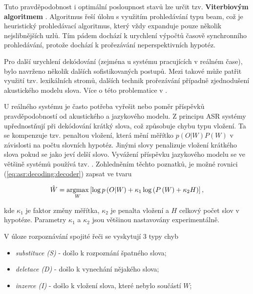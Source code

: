 \noindent Tuto pravděpodobnost i optimální posloupnost stavů lze určit tzv. \textbf{Viterbiovým algoritmem} \cite{Holmes2001}. Algoritmus řeší úlohu s využitím prohledávání typu beam, což je heuristický prohledávací algoritmus, který vždy expanduje pouze několik nejslibnějších uzlů. Tím pádem dochází k urychlení výpočtů časově synchronního prohledávání, protože dochází k prořezávání neperspektivních hypotéz.

Pro další urychlení dekódování (zejména u systému pracujících v reálném čase), bylo navrženo několik dalších sofistikovaných postupů. Mezi takové může patřit využití tzv. lexikálních stromů, dalších technik prořezávání případně zjednodušení akustického modelu slova. Více o této problematice v \cite{Psutka2006}.

U reálného systému je často potřeba vyřešit nebo  poměr příspěvků pravděpodobností od akustického a jazykového modelu. Z principu ASR systémy upřednostňují při dekódování krátký slova, což způsobuje chybu typu vložení. Ta se kompenzuje tzv. penaltou vložení, která mění měřítko $p(O|W)P(W)$ v závislosti na počtu slovních hypotéz. Jinými slovy penalizuje vložení krátkého slova pokud se jako  jeví delší slovo. Vyvážení příspěvku jazykového modelu se ve většině systémů používá tzv. . Zohledněním těchto poznatků, je možné rovnici (\ref{eq:asr:decoding:decoder}) zapsat ve tvaru

\begin{equation}
  \hat{W} = \operatorname*{argmax}_{W} \left[\log p\left(O|W\right) + \kappa_1 \log\left(P\left(W\right) + \kappa_2H\right)\right],
  \label{eq:asr:decoding:compensated}
\end{equation}

\noindent kde $\kappa_1$ je faktor změny měřítka, $\kappa_2$ je penalta vložení a $H$ celkový počet slov v hypotéze. Parametry $\kappa_1$ a $\kappa_2$ jsou většinou nastavovány experimentálně.

V úloze rozpoznávání spojité řeči se vyskytují 3 typy chyb

\begin{itemize}
  \item \textit{substituce (S)} - došlo k rozpoznání špatného slova;
  \item \textit{deletace (D)} - došlo k vynechání nějakého slova;
  \item \textit{inzerce (I)} - došlo k vložení slova, které nebylo součástí $W$;
\end{itemize}

